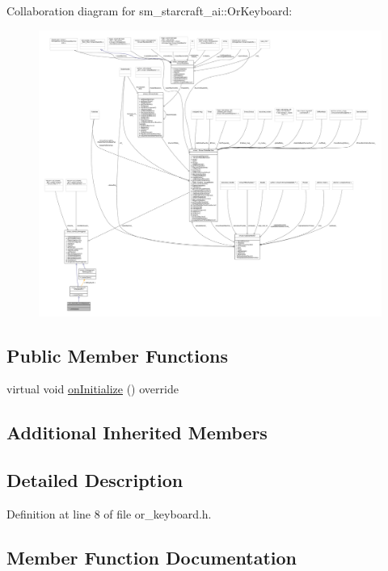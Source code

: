 Collaboration diagram for sm\+\_\+starcraft\+\_\+ai\+:\+:Or\+Keyboard\+:
\nopagebreak
\begin{figure}[H]
\begin{center}
\leavevmode
\includegraphics[width=350pt]{classsm__starcraft__ai_1_1OrKeyboard__coll__graph}
\end{center}
\end{figure}
\subsection*{Public Member Functions}
\begin{DoxyCompactItemize}
\item 
virtual void \hyperlink{classsm__starcraft__ai_1_1OrKeyboard_a56d5ebd1e9382e0e8ca558dac64b8614}{on\+Initialize} () override
\end{DoxyCompactItemize}
\subsection*{Additional Inherited Members}


\subsection{Detailed Description}


Definition at line 8 of file or\+\_\+keyboard.\+h.



\subsection{Member Function Documentation}
